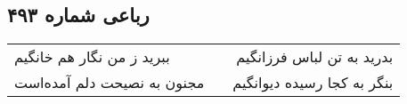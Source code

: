 \begin{center}
\section*{رباعی شماره ۴۹۳}
\label{sec:sh493}
\begin{longtable}{l p{0.5cm} r}
ببرید ز من نگار هم خانگیم
&&
بدرید به تن لباس فرزانگیم
\\
مجنون به نصیحت دلم آمده‌است
&&
بنگر به کجا رسیده دیوانگیم
\\
\end{longtable}
\end{center}
